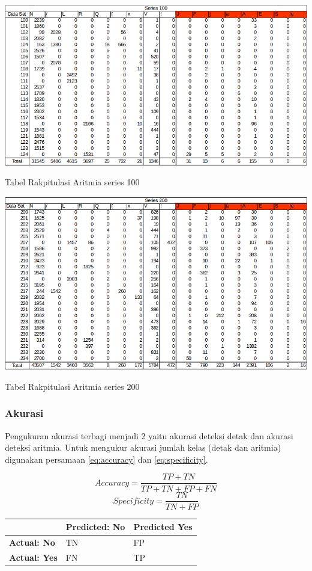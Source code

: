 \begin{table}[H]
	\centering
	\includegraphics[scale=0.5]{images/result1.png}
	\caption{Tabel Rakpitulasi Aritmia series 100}
	\label{tabel:result1}
\end{table}
\begin{table}[H]
	\centering
	\includegraphics[scale=0.5]{images/result2.png}
	\caption{Tabel Rakpitulasi Aritmia series 200}
	\label{tabel:result2}
\end{table}

\subsubsection{Akurasi}
Pengukuran akurasi terbagi menjadi 2 yaitu akurasi deteksi detak dan akurasi deteksi aritmia. Untuk mengukur akurasi jumlah kelas (detak dan aritmia) digunakan persamaan \ref{eq:accuracy} dan \ref{eq:specificity}.

\begin{equation}
	Accuracy = \frac{TP + TN}{TP+TN+FP+FN}
	\label{eq:accuracy}
\end{equation}
\begin{equation}
	Specificity = \frac{TN}{TN+FP}
	\label{eq:precission}
\end{equation}

\begin{table}
	\centering
	\begin{tabular}{L{3cm}|C{3cm}|C{3cm}|}
	 & \textbf{Predicted: No} & \textbf{Predicted Yes} \\
	\hline
	\textbf{Actual: No} & TN & FP \\
	\hline
	\textbf{Actual: Yes} & FN & TP \\
	\hline	
	\end{tabular}
\end{table}


